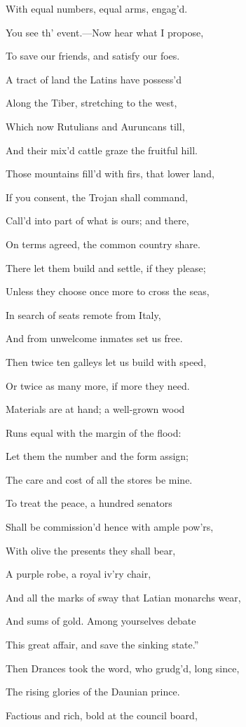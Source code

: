 With equal numbers, equal arms, engag’d.

You see th’ event.—Now hear what I propose,

To save our friends, and satisfy our foes.

A tract of land the Latins have possess’d

Along the Tiber, stretching to the west,

Which now Rutulians and Auruncans till,

And their mix’d cattle graze the fruitful hill.

Those mountains fill’d with firs, that lower land,

If you consent, the Trojan shall command,

Call’d into part of what is ours; and there,

On terms agreed, the common country share.

There let them build and settle, if they please;

Unless they choose once more to cross the seas,

In search of seats remote from Italy,

And from unwelcome inmates set us free.

Then twice ten galleys let us build with speed,

Or twice as many more, if more they need.

Materials are at hand; a well-grown wood

Runs equal with the margin of the flood:

Let them the number and the form assign;

The care and cost of all the stores be mine.

To treat the peace, a hundred senators

Shall be commission’d hence with ample pow’rs,

With olive the presents they shall bear,

A purple robe, a royal iv’ry chair,

And all the marks of sway that Latian monarchs wear,

And sums of gold. Among yourselves debate

This great affair, and save the sinking state.”

Then Drances took the word, who grudg’d, long since,

The rising glories of the Daunian prince.

Factious and rich, bold at the council board,

